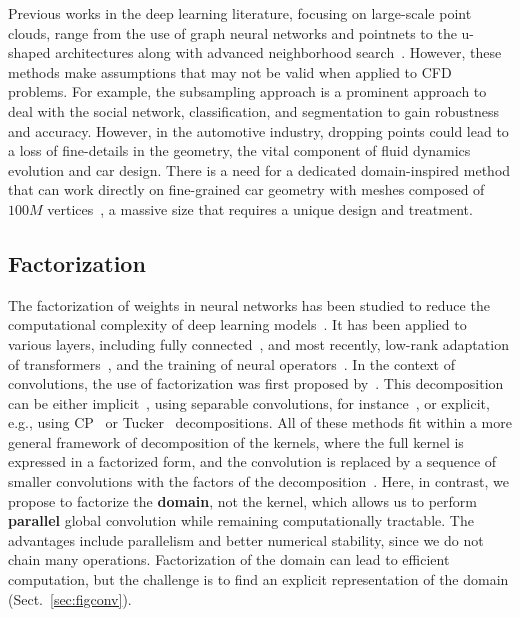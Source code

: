 Previous works in the deep learning literature, focusing on large-scale point clouds, range from the use of graph neural networks and pointnets to the u-shaped architectures along with advanced neighborhood search~\citep{qi2017pointnet,hamilton2017inductive,wang2019dynamic,choy20194d,shi2020pv}. 
However, these methods make assumptions that may not be valid when applied to CFD problems.
For example, the subsampling approach is a prominent approach to deal with the social network, classification, and segmentation to gain robustness and accuracy. However, in the automotive industry, dropping points could lead to a loss of fine-details in the geometry, the vital component of fluid dynamics evolution and car design. 
There is a need for a dedicated domain-inspired method that can work directly on fine-grained car geometry with meshes composed of $100M$ vertices~\citep{jacob2021deep}, a massive size that requires a unique design and treatment. 


\subsection{Factorization}

The factorization of weights in neural networks has been studied to reduce the computational complexity of deep learning models~\cite{panagakis2021tensor}. It has been applied to various layers, including fully connected~\cite{novikov2015tensorizing}, and most recently, low-rank adaptation of transformers~\citep{DBLP:journals/corr/abs-2106-09685},
and the training of neural operators~\citep{kossaifi2024multigrid}.
In the context of convolutions, the use of factorization was first proposed by~\citet{rigamonti2013learning}. 
This decomposition can be either implicit~\cite{chollet2017xception}, using separable convolutions, for instance~\citep{jaderberg2014speeding}, or explicit, e.g., using CP~\citep{astrid2017cp,lebedev2015speeding} or Tucker~\citep{yong2016compression} decompositions. All of these methods fit within a more general framework of decomposition of the kernels, where the full kernel is expressed in a factorized form, and the convolution is replaced by a sequence of smaller convolutions with the factors of the decomposition~\citep{9157354}.
Here, in contrast, we propose to factorize the \textbf{domain}, not the kernel, which allows us to perform \textbf{parallel} global convolution while remaining computationally tractable. The advantages include parallelism and better numerical stability, since we do not chain many operations.
Factorization of the domain can lead to efficient computation, but the challenge is to find an explicit representation of the domain (Sect.~\ref{sec:figconv}).
